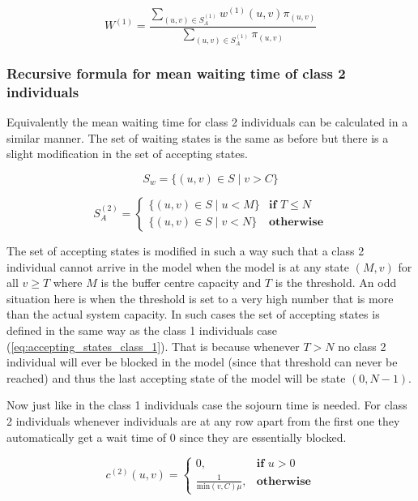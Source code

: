 \begin{equation} \label{eq:recursive-waiting-time-others}
    W^{(1)} = \frac{\sum_{(u,v) \in S_A^{(1)}} w^{(1)}(u,v) 
    \pi_{(u,v)}}{\sum_{(u,v) \in S_A^{(1)}} \pi_{(u,v)}}
\end{equation}



\subsubsection{Recursive formula for mean waiting time of 
class 2 individuals} \label{sec:recursive-waiting-time-ambulance}

Equivalently the mean waiting time for class 2 individuals can be calculated 
in a similar manner. 
The set of waiting states is the same as before but there is a slight modification 
in the set of accepting states.

\[
    S_w = \{(u, v) \in S \; | \; v > C \}    
\]

\begin{equation}\label{eq:accepting_states_class_2}
    S_A^{(2)}=
    \begin{cases}
        \{(u, v) \in S \; | \; u < M \} & \textbf{if } T \leq N\\
        \{(u, v) \in S \; | \; v < N \} & \textbf{otherwise}
    \end{cases}
\end{equation}

The set of accepting states is modified in such a way such that a class 2 
individual cannot arrive in the model when the model is at any state \((M, v)\) 
for 
all \(v \geq T\) where \(M\) is the buffer centre capacity and \(T\) is the threshold. 
An odd situation here is when the threshold is set to a very high number that is 
more than the actual system capacity. 
In such cases the set of accepting states is defined in the same way as the 
class 1 individuals case (\ref{eq:accepting_states_class_1}). 
That is because whenever \(T > N\) no class 2 individual will ever be blocked in 
the model 
(since that threshold can never be reached) and thus the last accepting state of 
the model will be state \( (0,N-1)\). 

Now just like in the class 1 individuals case the sojourn time is needed. 
For class 2 individuals whenever individuals are at any row apart from the 
first one they automatically get a wait time of \(0\) since they are essentially 
blocked.

\begin{equation} \label{eq:sojourn_ambulance}
    c^{(2)}(u,v) = 
    \begin{cases}
        0, & \textbf{if } u > 0 \\
        \frac{1}{\text{min}(v,C)\mu}, & \textbf{otherwise}
    \end{cases}
\end{equation}


